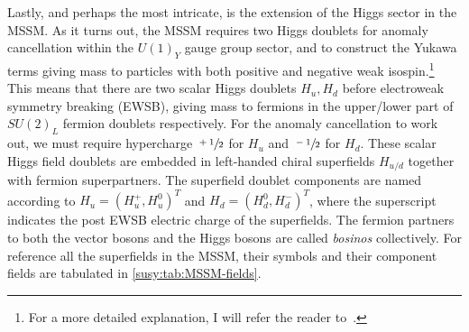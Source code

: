 \documentclass[../main.tex]{subfiles}
\begin{document}
Lastly, and perhaps the most intricate, is the extension of the Higgs sector in the MSSM\@.
As it turns out, the MSSM requires two Higgs doublets for anomaly cancellation within the \(U(1)_Y\) gauge group sector, and to construct the Yukawa terms giving mass to particles with both positive and negative weak isospin.\footnote{For a more detailed explanation, I will refer the reader to~\cite{Martin:1997ns}.}
This means that there are two scalar Higgs doublets \(H_u, H_d\) before electroweak symmetry breaking (EWSB), giving mass to fermions in the upper/lower part of \(SU(2)_L\) fermion doublets respectively.
For the anomaly cancellation to work out, we must require hypercharge \(\sfrac{+1}{2}\) for \(H_u\) and \(\sfrac{-1}{2}\) for \(H_d\).
These scalar Higgs field doublets are embedded in left-handed chiral superfields \(H_{u/d}\) together with fermion superpartners.
The superfield doublet components are named according to \(H_u = (H_u^+, H_u^0)^T\) and \(H_d = (H_d^0, H_d^-)^T\), where the superscript indicates the post EWSB electric charge of the superfields.
The fermion partners to both the vector bosons and the Higgs bosons are called \emph{bosinos} collectively.
For reference all the superfields in the MSSM, their symbols and their component fields are tabulated in \cref{susy:tab:MSSM-fields}.
\end{document}
